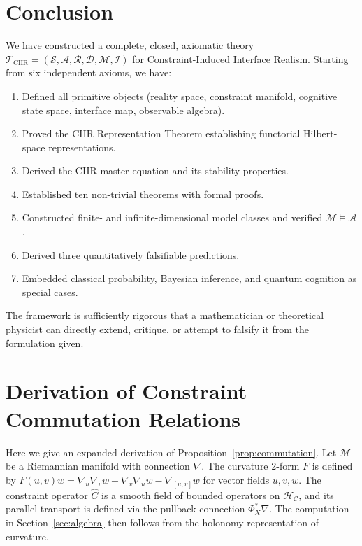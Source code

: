 \documentclass[twocolumn,aps,prd,superscriptaddress,nofootinbib]{revtex4-2}
\newcommand{\HC}{\mathcal{H}_{\mathcal{C}}}
\newcommand{\CR}{\mathcal{R}}
\newcommand{\CM}{\mathcal{M}}
\newcommand{\CS}{\mathcal{S}}
\newcommand{\CA}{\mathcal{A}}
\newcommand{\CD}{\mathcal{D}}
\newcommand{\CI}{\mathcal{I}}
\newcommand{\TCIIR}{\mathcal{T}_{\mathrm{CIIR}}}
\newcommand{\hatC}{\hat{C}}
\begin{document}
\section{Conclusion}
\label{sec:conclusion}

We have constructed a complete, closed, axiomatic theory $\TCIIR =
(\CS,\CA,\CR,\CD,\CM,\CI)$ for Constraint-Induced Interface Realism.
Starting from six independent axioms, we have:
\begin{enumerate}
\item Defined all primitive objects (reality space, constraint manifold,
      cognitive state space, interface map, observable algebra).
\item Proved the CIIR Representation Theorem establishing functorial
      Hilbert-space representations.
\item Derived the CIIR master equation and its stability properties.
\item Established ten non-trivial theorems with formal proofs.
\item Constructed finite- and infinite-dimensional model classes and verified
      $\mathcal{M} \models \mathcal{A}$.
\item Derived three quantitatively falsifiable predictions.
\item Embedded classical probability, Bayesian inference, and quantum
      cognition as special cases.
\end{enumerate}

The framework is sufficiently rigorous that a mathematician or theoretical
physicist can directly extend, critique, or attempt to falsify it from the
formulation given.

\appendix

\section{Derivation of Constraint Commutation Relations}
\label{app:commutation}

Here we give an expanded derivation of Proposition~\ref{prop:commutation}.
Let $\CM$ be a Riemannian manifold with connection $\nabla$.  The curvature
2-form $F$ is defined by $F(u,v)w = \nabla_u\nabla_v w - \nabla_v\nabla_u w - \nabla_{[u,v]}w$ for vector fields $u,v,w$.  The constraint operator $\hatC$ is a smooth field of bounded operators on $\HC$, and its parallel transport is defined via the pullback connection $\Phi_X^*\nabla$.  The computation in Section~\ref{sec:algebra} then follows from the holonomy representation of curvature.
\end{document}
